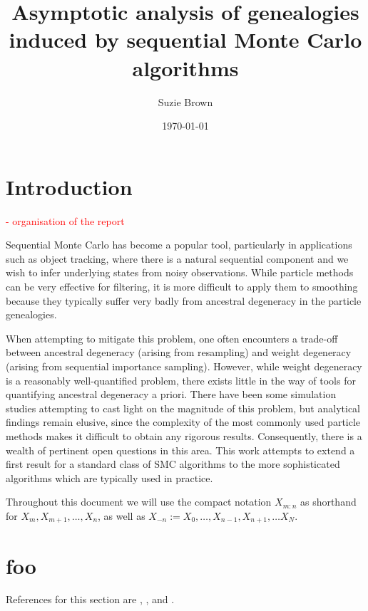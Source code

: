 \documentclass[fleqn]{article}
\title{Asymptotic analysis of genealogies induced by sequential Monte Carlo algorithms}
\author{Suzie Brown}
\date{\today}
\begin{document}
\maketitle
\thispagestyle{fancy}

\section{Introduction}
\textcolor{red}{
- organisation of the report\\
}

Sequential Monte Carlo has become a popular tool, particularly in applications such as object tracking, where there is a natural sequential component and we wish to infer underlying states from noisy observations.
While particle methods can be very effective for filtering, it is more difficult to apply them to smoothing because they typically suffer very badly from ancestral degeneracy in the particle genealogies.

When attempting to mitigate this problem, one often encounters a trade-off between ancestral degeneracy (arising from resampling) and weight degeneracy (arising from sequential importance sampling). However, while weight degeneracy is a reasonably well-quantified problem, there exists little in the way of tools for quantifying ancestral degeneracy a priori. There have been some simulation studies attempting to cast light on the magnitude of this problem, but analytical findings remain elusive, since the complexity of the most commonly used particle methods makes it difficult to obtain any rigorous results.
Consequently, there is a wealth of pertinent open questions in this area. This work attempts to extend a first result for a standard class of SMC algorithms to the more sophisticated algorithms which are typically used in practice.

Throughout this document we will use the compact notation $X_{m:n}$ as shorthand for $X_m, X_{m+1}, \dots, X_n$, as well as $X_{-n} := X_0, \dots, X_{n-1}, X_{n+1}, \dots X_{N}$.

\section{foo}
References for this section are \citet{doucet2001}, \citet{delmoral2006}, and \citet{doucet2009}.
\end{document}
